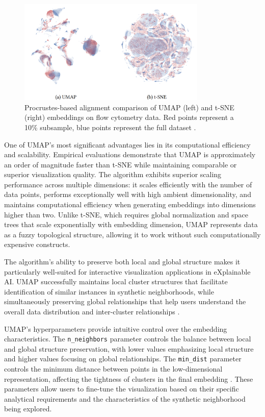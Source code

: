 \begin{figure}
    \centering
    \includegraphics[width=0.8\textwidth]{images/umap.png}
    \caption{
    Procrustes-based alignment comparison of UMAP (left) and t-SNE (right) embeddings on flow cytometry data. Red points represent a 10\% subsample, blue points represent the full dataset \cite{mcinnes2020umapuniformmanifoldapproximation}.}
    \label{fig:umap_tsne_stability}
\end{figure}

One of UMAP's most significant advantages lies in its computational efficiency and scalability. Empirical evaluations demonstrate that UMAP is approximately an order of magnitude faster than t-SNE while maintaining comparable or superior visualization quality. The algorithm exhibits superior scaling performance across multiple dimensions: it scales efficiently with the number of data points, performs exceptionally well with high ambient dimensionality, and maintains computational efficiency when generating embeddings into dimensions higher than two. Unlike t-SNE, which requires global normalization and space trees that scale exponentially with embedding dimension, UMAP represents data as a fuzzy topological structure, allowing it to work without such computationally expensive constructs.

The algorithm's ability to preserve both local and global structure makes it particularly well-suited for interactive visualization applications in eXplainable AI. UMAP successfully maintains local cluster structures that facilitate identification of similar instances in synthetic neighborhoods, while simultaneously preserving global relationships that help users understand the overall data distribution and inter-cluster relationships \cite{becht2019evaluation}. 

UMAP's hyperparameters provide intuitive control over the embedding characteristics. The \texttt{n\_neighbors} parameter controls the balance between local and global structure preservation, with lower values emphasizing local structure and higher values focusing on global relationships. The \texttt{min\_dist} parameter controls the minimum distance between points in the low-dimensional representation, affecting the tightness of clusters in the final embedding \cite{mcinnes2020umap}. These parameters allow users to fine-tune the visualization based on their specific analytical requirements and the characteristics of the synthetic neighborhood being explored.

